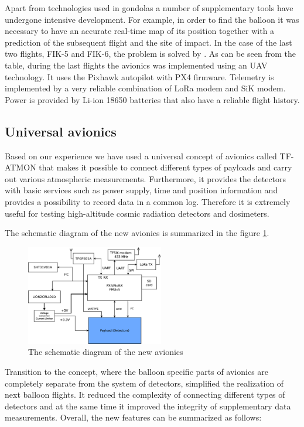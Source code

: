 \documentclass{Rpd}
\begin{document}
Apart from technologies used in gondolas a number of supplementary tools have undergone intensive development. For example, in order to find the balloon it was necessary to have an accurate real-time map of its position together with a prediction of the subsequent flight and the site of impact. In the case of the last two flights, FIK-5 and FIK-6, the problem is solved by \cite{habhub_tracker}.
As can be seen from the table, during the last flights the avionics was implemented using an UAV technology. It uses the Pixhawk autopilot with PX4 firmware. Telemetry is implemented by a very reliable combination of LoRa modem and SiK modem. Power is provided by Li-ion 18650 batteries that also have a reliable flight history.



\subsection{Universal avionics}
Based on our experience we have used a universal concept of avionics called TF-ATMON that makes it possible to connect different types of payloads and carry out various atmospheric measurements. Furthermore, it provides the detectors with basic services such as power supply, time and position information and provides a possibility to record data in a common log. Therefore it is extremely useful for testing high-altitude cosmic radiation detectors and dosimeters.

The schematic diagram of the new avionics is summarized in the figure \ref{avionics_schematics}.


\begin{center}
\begin{figure}%
	\centerline{\includegraphics[width=60mm]{img/avionics_block_schematics.eps}}
	\caption{The schematic diagram of the new avionics \label{avionics_schematics}}
\end{figure}
\end{center}

Transition to the concept, where the balloon specific parts of avionics are completely separate from the system of detectors, simplified the realization of next balloon flights. It reduced the complexity of connecting different types of detectors and at the same time it improved the integrity of supplementary data measurements. Overall, the new features can be summarized as follows:
\end{document}
